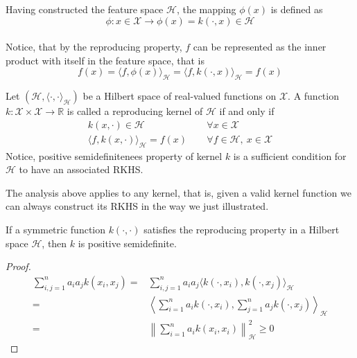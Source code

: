Having constructed the feature space $\mathcal{H}$, the mapping $\phi(x)$ is defined as
\\
\begin{equation}
    \phi: x \in \mathcal{X} \to \phi(x)=k(\cdot, x) \in \mathcal{H}
\end{equation}
\\
Notice, that by the reproducing property, $f$ can be represented as the inner product with itself in the feature space, that is 
\begin{equation}
    f(x)=\langle f, \phi(x)\rangle_{\mathcal{H}}=\langle f, k(\cdot, x)\rangle_{\mathcal{H}}=f(x)
\end{equation}

\begin{definition}
    Let $(\mathcal{H}, \langle \cdot, \cdot \rangle_\mathcal{H})$ be a Hilbert space of real-valued functions on $\mathcal{X}$. A function $k: \mathcal{X} \times \mathcal{X} \to \mathbb{R}$ is called a reproducing kernel of $\mathcal{H}$ if and only if 
     \begin{align}
        k(x, \cdot) \in \mathcal{H} &\quad \ \forall x \in \mathcal{X}    \\
        \langle  f, k(x, \cdot) \rangle_\mathcal{H} = f(x) &\quad \ \forall f\in \mathcal{H}, \ x \in \mathcal{X}
    \end{align}
    Notice, positive semidefinitenees property of kernel $k$ is a sufficient condition for $\mathcal{H}$ to have an associated RKHS.
\end{definition}

The analysis above applies to any kernel, that is, given a valid kernel function we can always construct its RKHS in the way we just illustrated.
\begin{theorem}
    If a symmetric function $k(\cdot, \cdot)$ satisfies the reproducing property in a Hilbert space $\mathcal{H}$, then $k$ is positive semidefinite.
\end{theorem}

\begin{proof}
    \begin{align}
        \sum\limits_{i,j=1}^n a_i a_j k(x_i, x_j)=& \sum\limits_{i,j=1}^n a_i a_j \langle k(\cdot, x_i), k(\cdot, x_j)\rangle_{\mathcal{H}}
        \\
        =& \left\langle \sum\limits_{i=1}^n a_i k(\cdot, x_i), \sum\limits_{j=1}^n a_j k(\cdot, x_j) \right\rangle_{\mathcal{H}} \\
        =& \left\| \sum\limits_{i=1}^n a_i k(x_i, x_i)\right\|_{\mathcal{H}}^2 \geq 0
    \end{align}
\end{proof}
   
